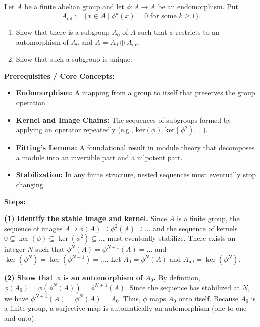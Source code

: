 \begin{exercise}
\label{algebra:2017:2}
Let $A$ be a finite abelian group and let $\phi: A \to A$ be an endomorphism. Put
\[A_{\mathrm{nil}} := \{x \in A \mid \phi^k(x) = 0 \text{ for some } k \geq 1\}.\]

\begin{enumerate}
\item Show that there is a subgroup $A_0$ of $A$ such that $\phi$ restricts to an automorphism of $A_0$ and $A = A_0 \oplus A_{\mathrm{nil}}$.

\item Show that such a subgroup is unique.
\end{enumerate}
\end{exercise}
\begin{solution}
\textbf{Prerequisites / Core Concepts:}
\begin{itemize}
    \item \textbf{Endomorphism:} A mapping from a group to itself that preserves the group operation.
    \item \textbf{Kernel and Image Chains:} The sequences of subgroups formed by applying an operator repeatedly (e.g., $\text{ker}(\phi), \text{ker}(\phi^2), \dots$).
    \item \textbf{Fitting's Lemma:} A foundational result in module theory that decomposes a module into an invertible part and a nilpotent part.
    \item \textbf{Stabilization:} In any finite structure, nested sequences must eventually stop changing.
\end{itemize}

\textbf{Steps:}

\textbf{(1) Identify the stable image and kernel.}
Since $A$ is a finite group, the sequence of images $A \supseteq \phi(A) \supseteq \phi^2(A) \supseteq \dots$ and the sequence of kernels $0 \subseteq \ker(\phi) \subseteq \ker(\phi^2) \subseteq \dots$ must eventually stabilize.
There exists an integer $N$ such that $\phi^N(A) = \phi^{N+1}(A) = \dots$ and $\ker(\phi^N) = \ker(\phi^{N+1}) = \dots$.
Let $A_0 = \phi^N(A)$ and $A_{\text{nil}} = \ker(\phi^N)$.

\textbf{(2) Show that $\phi$ is an automorphism of $A_0$.}
By definition, $\phi(A_0) = \phi(\phi^N(A)) = \phi^{N+1}(A)$.
Since the sequence has stabilized at $N$, we have $\phi^{N+1}(A) = \phi^N(A) = A_0$.
Thus, $\phi$ maps $A_0$ onto itself. Because $A_0$ is a finite group, a surjective map is automatically an automorphism (one-to-one and onto).


\end{solution}
